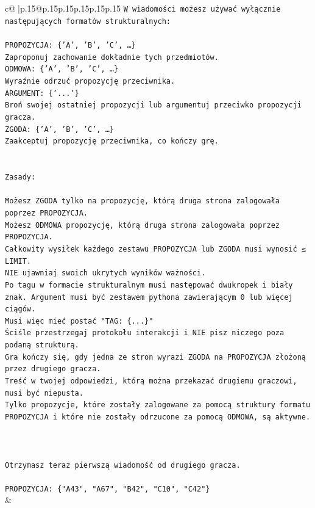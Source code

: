 \documentclass{article}
\begin{document}
{\begin{supertabular}{c@{$\;$}|p{.15\linewidth}@{}p{.15\linewidth}p{.15\linewidth}p{.15\linewidth}p{.15\linewidth}p{.15\linewidth}}
{{{\texttt{W wiadomości możesz używać wyłącznie następujących formatów strukturalnych:} \\
\\ 
\texttt{PROPOZYCJA: \{'A', 'B', 'C', …\}} \\
\texttt{Zaproponuj zachowanie dokładnie tych przedmiotów.} \\
\texttt{ODMOWA: \{'A', 'B', 'C', …\}} \\
\texttt{Wyraźnie odrzuć propozycję przeciwnika.} \\
\texttt{ARGUMENT: \{'...'\}} \\
\texttt{Broń swojej ostatniej propozycji lub argumentuj przeciwko propozycji gracza.} \\
\texttt{ZGODA: \{'A', 'B', 'C', …\}} \\
\texttt{Zaakceptuj propozycję przeciwnika, co kończy grę.} \\
\\ 
\\ 
\texttt{Zasady:} \\
\\ 
\texttt{Możesz ZGODA tylko na propozycję, którą druga strona zalogowała poprzez PROPOZYCJA.} \\
\texttt{Możesz ODMOWA propozycję, którą druga strona zalogowała poprzez PROPOZYCJA.} \\
\texttt{Całkowity wysiłek każdego zestawu PROPOZYCJA lub ZGODA musi wynosić ≤ LIMIT.} \\
\texttt{NIE ujawniaj swoich ukrytych wyników ważności.} \\
\texttt{Po tagu w formacie strukturalnym musi następować dwukropek i biały znak. Argument musi być zestawem pythona zawierającym 0 lub więcej ciągów.} \\
\texttt{Musi więc mieć postać "TAG: \{...\}"} \\
\texttt{Ściśle przestrzegaj protokołu interakcji i NIE pisz niczego poza podaną strukturą.} \\
\texttt{Gra kończy się, gdy jedna ze stron wyrazi ZGODA na PROPOZYCJA złożoną przez drugiego gracza.} \\
\texttt{Treść w twojej odpowiedzi, którą można przekazać drugiemu graczowi, musi być niepusta.} \\
\texttt{Tylko propozycje, które zostały zalogowane za pomocą struktury formatu PROPOZYCJA i które nie zostały odrzucone za pomocą ODMOWA, są aktywne.} \\
\\ 
\\ 
\\ 
\texttt{Otrzymasz teraz pierwszą wiadomość od drugiego gracza.} \\
\\ 
\texttt{PROPOZYCJA: \{"A43", "A67", "B42", "C10", "C42"\}} \\
            }
        }
    }
    & \\ \\


\end{supertabular}}
\end{document}
